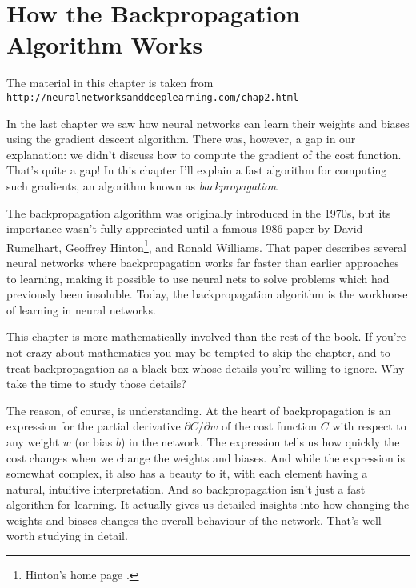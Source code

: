 
\chapter{How the Backpropagation Algorithm Works}
\label{chap:02HowtheBackpropagationAlgorithmWorks}

The material in this chapter is taken from\\
\lstinline{http://neuralnetworksanddeeplearning.com/chap2.html}

In the last chapter we saw how neural networks can learn their weights and biases using the gradient descent algorithm. There was, however, a gap in our explanation: we didn't discuss how to compute the gradient of the cost function. That's quite a gap! In this chapter I'll explain a fast algorithm for computing such gradients, an algorithm known as \textit{backpropagation}. 


The backpropagation algorithm was originally introduced in the 1970s, but its importance wasn't fully appreciated until a famous 1986 paper \cite{rumelhart1986} by David Rumelhart, Geoffrey Hinton\footnote{Hinton's home page \cite{Hinton2019}.}, and Ronald Williams. That paper describes several neural networks where backpropagation works far faster than earlier approaches to learning, making it possible to use neural nets to solve problems which had previously been insoluble. Today, the backpropagation algorithm is the workhorse of learning in neural networks.


This chapter is more mathematically involved than the rest of the book. If you're not crazy about mathematics you may be tempted to skip the chapter, and to treat backpropagation as a black box whose details you're willing to ignore. Why take the time to study those details?

The reason, of course, is understanding. At the heart of backpropagation is an expression for the partial derivative $\partial C / \partial w$ of the cost function $C$ with respect to any weight $w$ (or bias $b$) in the network. The expression tells us how quickly the cost changes when we change the weights and biases. And while the expression is somewhat complex, it also has a beauty to it, with each element having a natural, intuitive interpretation. And so backpropagation isn't just a fast algorithm for learning. It actually gives us detailed insights into how changing the weights and biases changes the overall behaviour of the network. That's well worth studying in detail.

